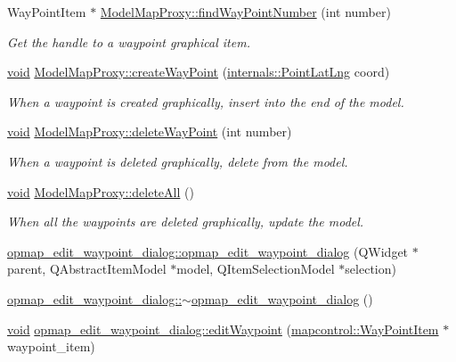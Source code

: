 \begin{DoxyCompactItemize}
\item 
\-Way\-Point\-Item $\ast$ \hyperlink{group___o_p_map_plugin_gabc5719db39d81801af2bce5a5dd3eee9}{\-Model\-Map\-Proxy\-::find\-Way\-Point\-Number} (int number)
\begin{DoxyCompactList}\small\item\em \-Get the handle to a waypoint graphical item. \end{DoxyCompactList}\item 
\hyperlink{group___u_a_v_objects_plugin_ga444cf2ff3f0ecbe028adce838d373f5c}{void} \hyperlink{group___o_p_map_plugin_ga4e68125d7b19aa3adf055e50bea8afdf}{\-Model\-Map\-Proxy\-::create\-Way\-Point} (\hyperlink{structinternals_1_1_point_lat_lng}{internals\-::\-Point\-Lat\-Lng} coord)
\begin{DoxyCompactList}\small\item\em \-When a waypoint is created graphically, insert into the end of the model. \end{DoxyCompactList}\item 
\hyperlink{group___u_a_v_objects_plugin_ga444cf2ff3f0ecbe028adce838d373f5c}{void} \hyperlink{group___o_p_map_plugin_ga6e67b9c6c661db0b0c02119c6372c5b7}{\-Model\-Map\-Proxy\-::delete\-Way\-Point} (int number)
\begin{DoxyCompactList}\small\item\em \-When a waypoint is deleted graphically, delete from the model. \end{DoxyCompactList}\item 
\hyperlink{group___u_a_v_objects_plugin_ga444cf2ff3f0ecbe028adce838d373f5c}{void} \hyperlink{group___o_p_map_plugin_gaf33e33d2457fd1ebc593907ffd3c0167}{\-Model\-Map\-Proxy\-::delete\-All} ()
\begin{DoxyCompactList}\small\item\em \-When all the waypoints are deleted graphically, update the model. \end{DoxyCompactList}\item 
\hyperlink{group___o_p_map_plugin_ga0681c04758995d1dca076a79d6c7ebb8}{opmap\-\_\-edit\-\_\-waypoint\-\_\-dialog\-::opmap\-\_\-edit\-\_\-waypoint\-\_\-dialog} (\-Q\-Widget $\ast$parent, \-Q\-Abstract\-Item\-Model $\ast$model, \-Q\-Item\-Selection\-Model $\ast$selection)
\item 
\hyperlink{group___o_p_map_plugin_ga7d3684f9a7139a132614c5f4d9d91910}{opmap\-\_\-edit\-\_\-waypoint\-\_\-dialog\-::$\sim$opmap\-\_\-edit\-\_\-waypoint\-\_\-dialog} ()
\item 
\hyperlink{group___u_a_v_objects_plugin_ga444cf2ff3f0ecbe028adce838d373f5c}{void} \hyperlink{group___o_p_map_plugin_gaf5d4c9a4e4bc3c4b358df3168b2e6b03}{opmap\-\_\-edit\-\_\-waypoint\-\_\-dialog\-::edit\-Waypoint} (\hyperlink{classmapcontrol_1_1_way_point_item}{mapcontrol\-::\-Way\-Point\-Item} $\ast$waypoint\-\_\-item)

\end{DoxyCompactItemize}
